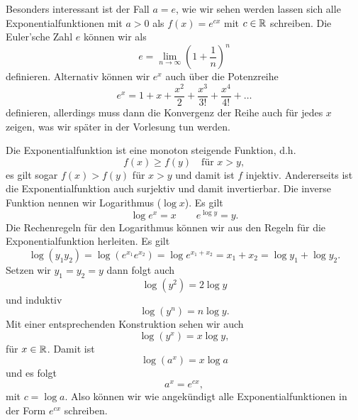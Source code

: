 Besonders interessant ist  der Fall \(a=e\), wie wir sehen werden lassen sich alle Exponentialfunktionen mit \(a > 0\) als \(f(x) = e^{cx}\) mit \(c\in \mathbb{R}\) schreiben. Die Euler’sche Zahl \(e\) können wir als
\begin{equation*}
 e= \lim_{n \rightarrow \infty} \left(1 + \frac{1}n\right)^n\end{equation*}
definieren. Alternativ können wir \(e^x\) auch über die Potenzreihe
\begin{equation*}
 e^{x} = 1 + x+ \frac{x^2}2 + \frac{x^3}{3!} + \frac{x^4}{4!} + \ldots\end{equation*}
definieren, allerdings muss dann die Konvergenz der Reihe auch für jedes \(x\) zeigen, was wir später in der Vorlesung tun werden.

Die Exponentialfunktion ist eine monoton steigende Funktion, d.h.
\begin{equation*}
 f(x) \geq f(y) \quad \text{für } x > y,\end{equation*}
es gilt sogar \(f(x) > f(y)\) für \(x > y\) und damit ist \(f\) injektiv. Andererseits ist die Exponentialfunktion auch surjektiv und damit invertierbar. Die inverse Funktion nennen wir Logarithmus (\(\log x\)). Es gilt
\begin{equation*}
 \log e^x = x \qquad e^{\log y} = y.\end{equation*}
Die Rechenregeln für den Logarithmus können wir aus den Regeln für die Exponentialfunktion herleiten. Es gilt
\begin{equation*}
 \log (y_1 y_2) = \log (e^{x_1} e^{x_2}) = \log e^{x_1 + x_2} = x_1 + x_2 = \log y_1 + \log y_2.\end{equation*}
Setzen wir \(y_1 = y_2 =y\) dann folgt auch
\begin{equation*}
  \log ( y^2) = 2 \log y\end{equation*}
und induktiv
\begin{equation*}
  \log ( y^n) = n \log y.\end{equation*}
Mit einer entsprechenden Konstruktion sehen wir auch
\begin{equation*}
 \log (y^x) = x \log y,\end{equation*}
für \(x \in \mathbb{R}\). Damit ist
\begin{equation*}
 \log (a^x) = x \log a\end{equation*}
und es folgt
\begin{equation*}
 a^x = e^{c x},\end{equation*}
mit \(c= \log a\). Also können wir wie angekündigt alle Exponentialfunktionen in der Form \(e^{cx}\) schreiben.


